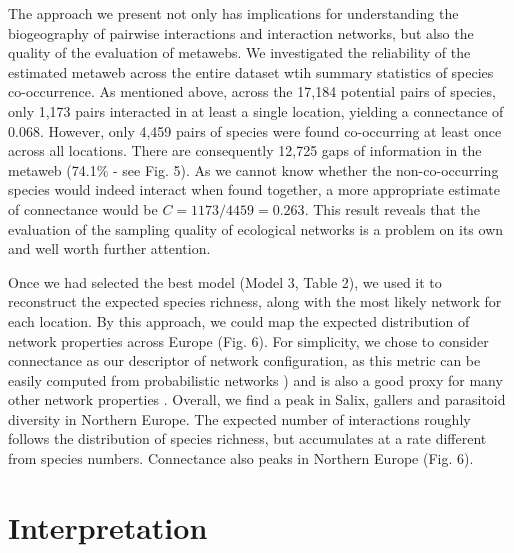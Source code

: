 \documentclass[12pt]{article}
\begin{document}
The approach we present not only has implications for understanding the
biogeography of pairwise interactions and interaction networks, but also the
quality of the evaluation of metawebs. We investigated the reliability of the
estimated metaweb across the entire dataset wtih summary statistics of species
co-occurrence. As mentioned above, across the 17,184 potential pairs of
species, only 1,173 pairs interacted in at least a single location, yielding a
connectance of 0.068. However, only 4,459 pairs of species were found co-occurring
at least once across all locations. There are consequently
12,725 gaps of information in the metaweb (74.1\% - see Fig. 5). As we cannot
know whether the non-co-occurring species would indeed interact when found
together, a more appropriate estimate of connectance would be
$C=1173/4459=0.263$. This result reveals that the evaluation of the sampling
quality of ecological networks is a problem on its own and well worth further
attention.

Once we had selected the best model (Model 3, Table 2), we used it to
reconstruct the expected species richness, along with the most likely network
for each location. By this approach, we could map the expected
distribution of network properties across Europe (Fig. 6). For simplicity, we
chose to consider connectance as our descriptor of network configuration, as this
metric can be easily computed from probabilistic networks \citep{Poisot2015c}) and is
also a good proxy for many other network properties \citep{Poisot2014}. Overall, we
find a peak in Salix, gallers and parasitoid diversity in Northern Europe. The
expected number of interactions roughly follows the distribution of species
richness, but accumulates at a rate different from species numbers.
Connectance also peaks in Northern Europe (Fig. 6).

\section*{Interpretation}
\end{document}
